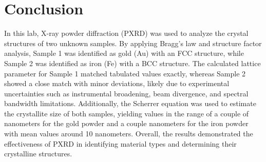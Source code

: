 \section{Conclusion}
In this lab, X-ray powder diffraction (PXRD) was used to analyze the crystal structures of two unknown samples. By applying Bragg’s law and structure factor analysis, Sample 1 was identified as gold (Au) with an FCC structure, while Sample 2 was identified as iron (Fe) with a BCC structure. The calculated lattice parameter for Sample 1 matched tabulated values exactly, whereas Sample 2 showed a close match with minor deviations, likely due to experimental uncertainties such as instrumental broadening, beam divergence, and spectral bandwidth limitations. Additionally, the Scherrer equation was used to estimate the crystallite size of both samples, yielding values in the range of a couple of nanometers for the gold powder and a couple nanometers for the iron powder with mean values around 10 nanometers. Overall, the results demonstrated the effectiveness of PXRD in identifying material types and determining their crystalline structures.

